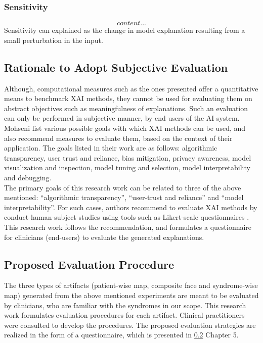 \documentclass[../report.tex]{subfiles}
\begin{document}
    \subsubsection{Sensitivity}
    \begin{equation}
    	content...
    \end{equation}
    Sensitivity can explained as the change in model explanation resulting from a small perturbation in the input.
    
    \subsection{Rationale to Adopt Subjective Evaluation}
    Although, computational measures such as the ones presented offer a quantitative means to benchmark XAI methods, they cannot be used for evaluating them on abstract objectives such as meaningfulness of explanations. Such an evaluation can only be performed in subjective manner, by end users of the AI system.\\
    Mohseni \etal \cite{mohseni2021multidisciplinary} list various possible goals with which XAI methods can be used, and also recommend measures to evaluate them, based on the context of their application. The goals listed in their work are as follows: algorithmic transparency, user trust and reliance, bias mitigation, privacy awareness, model visualization and inspection, model tuning and selection, model interpretability and debugging.\\ 
    The primary goals of this research work can be related to three of the above mentioned: \enquote{algorithmic transparency}, \enquote{user-trust and reliance} and \enquote{model interpretability}. For such cases, authors recommend to evaluate XAI methods by conduct human-subject studies using tools such as Likert-scale questionnaires \cite{likert_scale}. This research work follows the recommendation, and formulates a questionnaire for clinicians (end-users) to evaluate the generated explanations. 
    \subsection{Proposed Evaluation Procedure}
    The three types of artifacts (patient-wise map, composite face and syndrome-wise map) generated from the above mentioned experiments are meant to be evaluated by clinicians, who are familiar with the syndromes in our scope. This research work formulates evaluation procedures for each artifact. Clinical practitioners were consulted to develop the procedures. The proposed evaluation strategies are realized in the form of a questionnaire, which is presented in \ref{} Chapter 5. 
\end{document}
